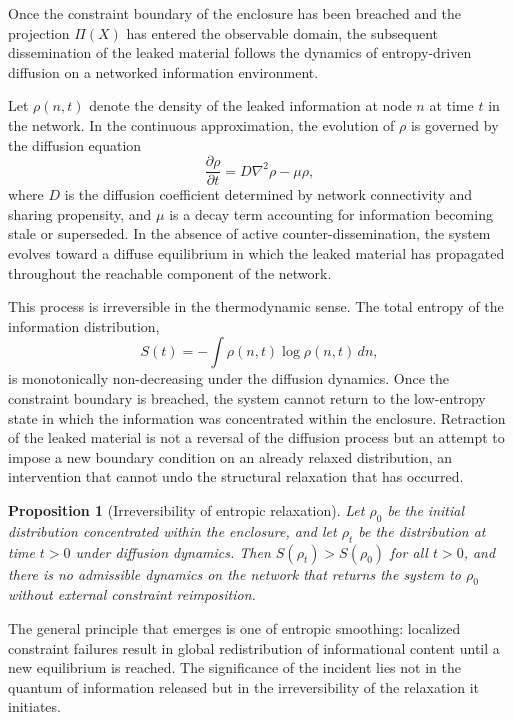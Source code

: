 \documentclass[12pt, oneside]{article}
\theoremstyle{plain}
\newtheorem{proposition}[theorem]{Proposition}
\theoremstyle{definition}
\theoremstyle{remark}
\newcommand{\proj}{\Pi}
\begin{document}
Once the constraint boundary of the enclosure has been breached and the projection $\proj(X)$
has entered the observable domain, the subsequent dissemination of the leaked material
follows the dynamics of entropy-driven diffusion on a networked information environment.

Let $\rho(n, t)$ denote the density of the leaked information at node $n$ at time $t$ in
the network. In the continuous approximation, the evolution of $\rho$ is governed by the
diffusion equation
\[
  \frac{\partial \rho}{\partial t} = D \nabla^2 \rho - \mu \rho,
\]
where $D$ is the diffusion coefficient determined by network connectivity and sharing
propensity, and $\mu$ is a decay term accounting for information becoming stale or
superseded. In the absence of active counter-dissemination, the system evolves toward a
diffuse equilibrium in which the leaked material has propagated throughout the reachable
component of the network.

This process is irreversible in the thermodynamic sense. The total entropy of the
information distribution,
\[
  S(t) = -\int \rho(n,t) \log \rho(n,t) \, dn,
\]
is monotonically non-decreasing under the diffusion dynamics. Once the constraint boundary
is breached, the system cannot return to the low-entropy state in which the information was
concentrated within the enclosure. Retraction of the leaked material is not a reversal of
the diffusion process but an attempt to impose a new boundary condition on an already
relaxed distribution, an intervention that cannot undo the structural relaxation that has
occurred.

\begin{proposition}[Irreversibility of entropic relaxation]
Let $\rho_0$ be the initial distribution concentrated within the enclosure, and let $\rho_t$
be the distribution at time $t > 0$ under diffusion dynamics. Then $S(\rho_t) > S(\rho_0)$
for all $t > 0$, and there is no admissible dynamics on the network that returns the system
to $\rho_0$ without external constraint reimposition.
\end{proposition}

The general principle that emerges is one of entropic smoothing: localized constraint
failures result in global redistribution of informational content until a new equilibrium
is reached. The significance of the incident lies not in the quantum of information released
but in the irreversibility of the relaxation it initiates.

\end{document}
